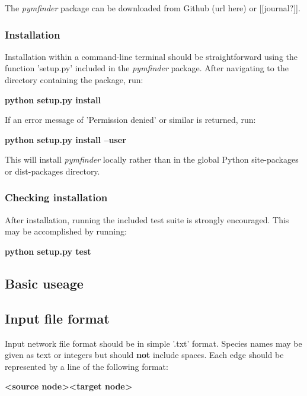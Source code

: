 \documentclass[12pt]{article}
\begin{document}
			The \emph{pymfinder} package can be downloaded from Github (url here) or [[journal?]].

		\subsubsection{Installation}

			Installation within a command-line terminal should be straightforward using the function 'setup.py' included in the \emph{pymfinder} package. After navigating to the directory containing the package, run:

			\textbf{python setup.py install}

			If an error message of 'Permission denied' or similar is returned, run:

			\textbf{python setup.py install --user}

			This will install \emph{pymfinder} locally rather than in the global Python site-packages or dist-packages directory. 


		\subsubsection{Checking installation}

			After installation, running the included test suite is strongly encouraged. This may be accomplished by running:

			\textbf{python setup.py test}



	\subsection{Basic useage}


		\subsection{Input file format}

			Input network file format should be in simple '.txt' format. Species names may be given as text or integers but should \textbf{not} include spaces. Each edge should be represented by a line of the following format:

			\textbf{\textless source node\textgreater  \textless target node\textgreater}
\end{document}
